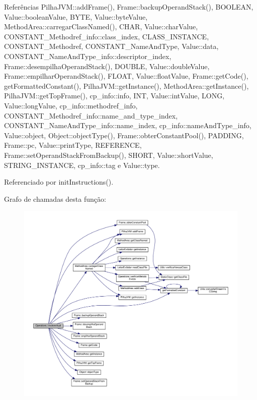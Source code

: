 Referências Pilha\+J\+V\+M\+::add\+Frame(), Frame\+::backup\+Operand\+Stack(), B\+O\+O\+L\+E\+AN, Value\+::boolean\+Value, B\+Y\+TE, Value\+::byte\+Value, Method\+Area\+::carregar\+Class\+Named(), C\+H\+AR, Value\+::char\+Value, C\+O\+N\+S\+T\+A\+N\+T\+\_\+\+Methodref\+\_\+info\+::class\+\_\+index, C\+L\+A\+S\+S\+\_\+\+I\+N\+S\+T\+A\+N\+CE, C\+O\+N\+S\+T\+A\+N\+T\+\_\+\+Methodref, C\+O\+N\+S\+T\+A\+N\+T\+\_\+\+Name\+And\+Type, Value\+::data, C\+O\+N\+S\+T\+A\+N\+T\+\_\+\+Name\+And\+Type\+\_\+info\+::descriptor\+\_\+index, Frame\+::desempilha\+Operand\+Stack(), D\+O\+U\+B\+LE, Value\+::double\+Value, Frame\+::empilhar\+Operand\+Stack(), F\+L\+O\+AT, Value\+::float\+Value, Frame\+::get\+Code(), get\+Formatted\+Constant(), Pilha\+J\+V\+M\+::get\+Instance(), Method\+Area\+::get\+Instance(), Pilha\+J\+V\+M\+::get\+Top\+Frame(), cp\+\_\+info\+::info, I\+NT, Value\+::int\+Value, L\+O\+NG, Value\+::long\+Value, cp\+\_\+info\+::methodref\+\_\+info, C\+O\+N\+S\+T\+A\+N\+T\+\_\+\+Methodref\+\_\+info\+::name\+\_\+and\+\_\+type\+\_\+index, C\+O\+N\+S\+T\+A\+N\+T\+\_\+\+Name\+And\+Type\+\_\+info\+::name\+\_\+index, cp\+\_\+info\+::name\+And\+Type\+\_\+info, Value\+::object, Object\+::object\+Type(), Frame\+::obter\+Constant\+Pool(), P\+A\+D\+D\+I\+NG, Frame\+::pc, Value\+::print\+Type, R\+E\+F\+E\+R\+E\+N\+CE, Frame\+::set\+Operand\+Stack\+From\+Backup(), S\+H\+O\+RT, Value\+::short\+Value, S\+T\+R\+I\+N\+G\+\_\+\+I\+N\+S\+T\+A\+N\+CE, cp\+\_\+info\+::tag e Value\+::type.



Referenciado por init\+Instructions().

Grafo de chamadas desta função\+:\nopagebreak
\begin{figure}[H]
\begin{center}
\leavevmode
\includegraphics[width=350pt]{classOperations_acf53d7e184b8828702b4d5036ef0a7a9_cgraph}
\end{center}
\end{figure}
\mbox{\label{classOperations_aaa890c310bc7a93e97b2c5004df94e70}} 
